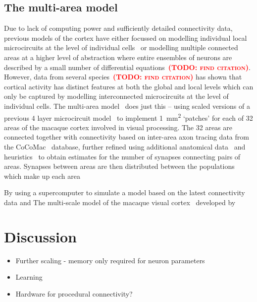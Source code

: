 \documentclass[9pt,twocolumn,twoside,lineno]{pnas-new}
\newcommand{\todo}[1]{\textbf{\textsc{\textcolor{red}{(TODO: #1)}}}}
\begin{document}
\subsection*{The multi-area model}
Due to lack of computing power and sufficiently detailed connectivity data, previous models of the cortex have either focussed on modelling individual local microcircuits at the level of individual cells~\citep{Izhikevich2008,Potjans2012} or modelling multiple connected areas at a higher level of abstraction where entire ensembles of neurons are described by a small number of differential equations~\todo{find citation}.
However, data from several species~\todo{find citation} has shown that cortical activity has distinct features at both the global and local levels which can only be captured by modelling interconnected microcircuits at the level of individual cells.
The multi-area model~\citep{Schmidt2018a,Schmidt2018} does just this -- using scaled versions of a previous 4 layer microcircuit model~\citep{Potjans2012} to implement \SI{1}{\milli\meter\squared} `patches' for each of 32 areas of the macaque cortex involved in visual processing.
The 32 areas are connected together with connectivity based on inter-area axon tracing data from the CoCoMac~\citep{Bakker2012} database, further refined using additional anatomical data~\citep{Markov2014} and heuristics~\citep{Ercsey-Ravasz2013} to obtain estimates for the number of synapses connecting pairs of areas.
Synapses between areas are then distributed between the populations which make up each area 

By using a supercomputer to simulate a model based on the latest connectivity data and The multi-scale model of the macaque visual cortex~\citep{Schmidt2018} developed by 


\section*{Discussion}
\begin{itemize}
    \item Further scaling - memory only required for neuron parameters
    \item Learning
    \item Hardware for procedural connectivity?
\end{itemize}
\end{document}
